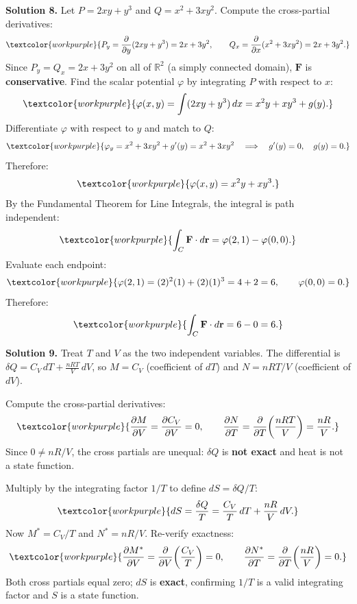 \noindent\textbf{Solution 8.}\quad
Let $P = 2xy + y^3$ and $Q = x^2 + 3xy^2$.
Compute the cross-partial derivatives:
\[
  \textcolor{workpurple}{P_y
  = \frac{\partial}{\partial y}(2xy + y^3)
  = 2x + 3y^2,
  \qquad
  Q_x
  = \frac{\partial}{\partial x}(x^2 + 3xy^2)
  = 2x + 3y^2.}
\]
Since $P_y = Q_x = 2x + 3y^2$ on all of $\mathbb{R}^2$ (a simply connected
domain), $\mathbf{F}$ is \textbf{conservative}.
Find the scalar potential $\varphi$ by integrating $P$ with respect to $x$:
\[
  \textcolor{workpurple}{\varphi(x,y)
  = \int(2xy + y^3)\,dx
  = x^2 y + xy^3 + g(y).}
\]
Differentiate $\varphi$ with respect to $y$ and match to $Q$:
\[
  \textcolor{workpurple}{\varphi_y
  = x^2 + 3xy^2 + g'(y)
  = x^2 + 3xy^2
  \quad\Longrightarrow\quad g'(y) = 0,\quad g(y) = 0.}
\]
Therefore:
\[
  \textcolor{workpurple}{\varphi(x,y) = x^2 y + xy^3.}
\]
By the Fundamental Theorem for Line Integrals, the integral is path
independent:
\[
  \textcolor{workpurple}{\int_C \mathbf{F}\cdot d\mathbf{r}
  = \varphi(2,1) - \varphi(0,0).}
\]
Evaluate each endpoint:
\[
  \textcolor{workpurple}{\varphi(2,1)
  = (2)^2(1) + (2)(1)^3
  = 4 + 2
  = 6,
  \qquad
  \varphi(0,0) = 0.}
\]
Therefore:
\[
  \textcolor{workpurple}{\int_C \mathbf{F}\cdot d\mathbf{r}
  = 6 - 0 = 6.}
\]

\medskip

\noindent\textbf{Solution 9.}\quad
Treat $T$ and $V$ as the two independent variables. The differential is
$\delta Q = C_V\,dT + \tfrac{nRT}{V}\,dV$, so
$M = C_V$ (coefficient of $dT$) and $N = nRT/V$ (coefficient of $dV$).

Compute the cross-partial derivatives:
\[
  \textcolor{workpurple}{\frac{\partial M}{\partial V}
  = \frac{\partial C_V}{\partial V}
  = 0,
  \qquad
  \frac{\partial N}{\partial T}
  = \frac{\partial}{\partial T}\!\left(\frac{nRT}{V}\right)
  = \frac{nR}{V}.}
\]
Since $0 \neq nR/V$, the cross partials are unequal: $\delta Q$ is
\textbf{not exact} and heat is not a state function.

Multiply by the integrating factor $1/T$ to define $dS = \delta Q/T$:
\[
  \textcolor{workpurple}{dS
  = \frac{\delta Q}{T}
  = \frac{C_V}{T}\,dT + \frac{nR}{V}\,dV.}
\]
Now $M^* = C_V/T$ and $N^* = nR/V$. Re-verify exactness:
\[
  \textcolor{workpurple}{\frac{\partial M^*}{\partial V}
  = \frac{\partial}{\partial V}\!\left(\frac{C_V}{T}\right)
  = 0,
  \qquad
  \frac{\partial N^*}{\partial T}
  = \frac{\partial}{\partial T}\!\left(\frac{nR}{V}\right)
  = 0.}
\]
Both cross partials equal zero; $dS$ is \textbf{exact}, confirming $1/T$ is a
valid integrating factor and $S$ is a state function.

